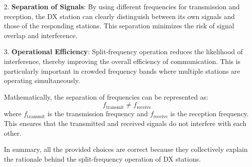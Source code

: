 2. \textbf{Separation of Signals}: By using different frequencies for transmission and reception, the DX station can clearly distinguish between its own signals and those of the responding stations. This separation minimizes the risk of signal overlap and interference.

3. \textbf{Operational Efficiency}: Split-frequency operation reduces the likelihood of interference, thereby improving the overall efficiency of communication. This is particularly important in crowded frequency bands where multiple stations are operating simultaneously.

Mathematically, the separation of frequencies can be represented as:
\[
f_{\text{transmit}} \neq f_{\text{receive}}
\]
where \( f_{\text{transmit}} \) is the transmission frequency and \( f_{\text{receive}} \) is the reception frequency. This ensures that the transmitted and received signals do not interfere with each other.

In summary, all the provided choices are correct because they collectively explain the rationale behind the split-frequency operation of DX stations.

